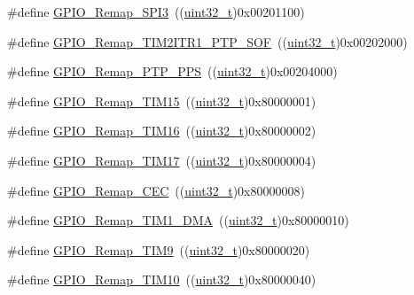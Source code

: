 \begin{DoxyCompactItemize}
\#define \hyperlink{group___g_p_i_o___remap__define_gac7fd74244a9d53ca02cc86bb6543a689}{G\+P\+I\+O\+\_\+\+Remap\+\_\+\+S\+P\+I3}~((\hyperlink{_p_e___types_8h_a33594304e786b158f3fb30289278f5af}{uint32\+\_\+t})0x00201100)
\item 
\#define \hyperlink{group___g_p_i_o___remap__define_ga0dc4bec540b9372479e63295fe68ac17}{G\+P\+I\+O\+\_\+\+Remap\+\_\+\+T\+I\+M2\+I\+T\+R1\+\_\+\+P\+T\+P\+\_\+\+S\+OF}~((\hyperlink{_p_e___types_8h_a33594304e786b158f3fb30289278f5af}{uint32\+\_\+t})0x00202000)
\item 
\#define \hyperlink{group___g_p_i_o___remap__define_ga3e9d7808d1e50393afde08e4a45d18aa}{G\+P\+I\+O\+\_\+\+Remap\+\_\+\+P\+T\+P\+\_\+\+P\+PS}~((\hyperlink{_p_e___types_8h_a33594304e786b158f3fb30289278f5af}{uint32\+\_\+t})0x00204000)
\item 
\#define \hyperlink{group___g_p_i_o___remap__define_gaead5c447875e8b384945424845452b82}{G\+P\+I\+O\+\_\+\+Remap\+\_\+\+T\+I\+M15}~((\hyperlink{_p_e___types_8h_a33594304e786b158f3fb30289278f5af}{uint32\+\_\+t})0x80000001)
\item 
\#define \hyperlink{group___g_p_i_o___remap__define_gac9d612f9f9f9f66faecbdbbc29d2ac61}{G\+P\+I\+O\+\_\+\+Remap\+\_\+\+T\+I\+M16}~((\hyperlink{_p_e___types_8h_a33594304e786b158f3fb30289278f5af}{uint32\+\_\+t})0x80000002)
\item 
\#define \hyperlink{group___g_p_i_o___remap__define_ga9fe98e01f8837d6a1ac4b4833f0fc45e}{G\+P\+I\+O\+\_\+\+Remap\+\_\+\+T\+I\+M17}~((\hyperlink{_p_e___types_8h_a33594304e786b158f3fb30289278f5af}{uint32\+\_\+t})0x80000004)
\item 
\#define \hyperlink{group___g_p_i_o___remap__define_gac5961690908d4a0737e82b5a7d271b9b}{G\+P\+I\+O\+\_\+\+Remap\+\_\+\+C\+EC}~((\hyperlink{_p_e___types_8h_a33594304e786b158f3fb30289278f5af}{uint32\+\_\+t})0x80000008)
\item 
\#define \hyperlink{group___g_p_i_o___remap__define_ga255adf908d7d530267707fee39ba2026}{G\+P\+I\+O\+\_\+\+Remap\+\_\+\+T\+I\+M1\+\_\+\+D\+MA}~((\hyperlink{_p_e___types_8h_a33594304e786b158f3fb30289278f5af}{uint32\+\_\+t})0x80000010)
\item 
\#define \hyperlink{group___g_p_i_o___remap__define_gadfed4d88bc9a4093d16ce64a85b6051a}{G\+P\+I\+O\+\_\+\+Remap\+\_\+\+T\+I\+M9}~((\hyperlink{_p_e___types_8h_a33594304e786b158f3fb30289278f5af}{uint32\+\_\+t})0x80000020)
\item 
\#define \hyperlink{group___g_p_i_o___remap__define_gac94252266a8fcb9ce7b55b5c55464110}{G\+P\+I\+O\+\_\+\+Remap\+\_\+\+T\+I\+M10}~((\hyperlink{_p_e___types_8h_a33594304e786b158f3fb30289278f5af}{uint32\+\_\+t})0x80000040)

\end{DoxyCompactItemize}
